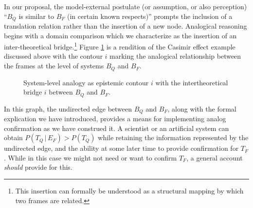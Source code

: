 \documentclass[11pt, oneside]{article}   	%
\begin{document}
In our proposal, the model-external postulate (or assumption, or also perception) ``$B_Q$ is similar to $B_F$ (in certain known respects)'' prompts the inclusion of a translation relation rather than the insertion of a new node. Analogical reasoning begins with a domain comparison which we characterize as the insertion of an inter-theoretical bridge.\footnote{This insertion can formally be understood as a structural mapping by which two frames are related.} Figure \ref{fig:SystemLadder} is a rendition of the Casimir effect example discussed above with the contour $i$ marking the analogical relationship between the frames at the level of systems $B_Q$ and $B_F$.


%

\begin{figure} [ht!]
\begin{center}
\caption{System-level analogy as epistemic contour $i$ with the intertheoretical bridge $i$ between $B_Q$ and $B_F$.}
\label{fig:SystemLadder}
\end{center}
\end{figure}












In this graph, the undirected edge between $B_Q$ and $B_F$, along with the formal explication we have introduced, provides a means for implementing analog confirmation as we have construed it.  A scientist or an artificial system can obtain $P(T_Q\,|\,E_F)>P(T_Q)$ while retaining the information represented by the undirected edge, and the ability at some later time to provide confirmation for $T_F$.  While in this case we might not need or want to confirm $T_F$, a general account \emph{should} provide for this.
\end{document}
